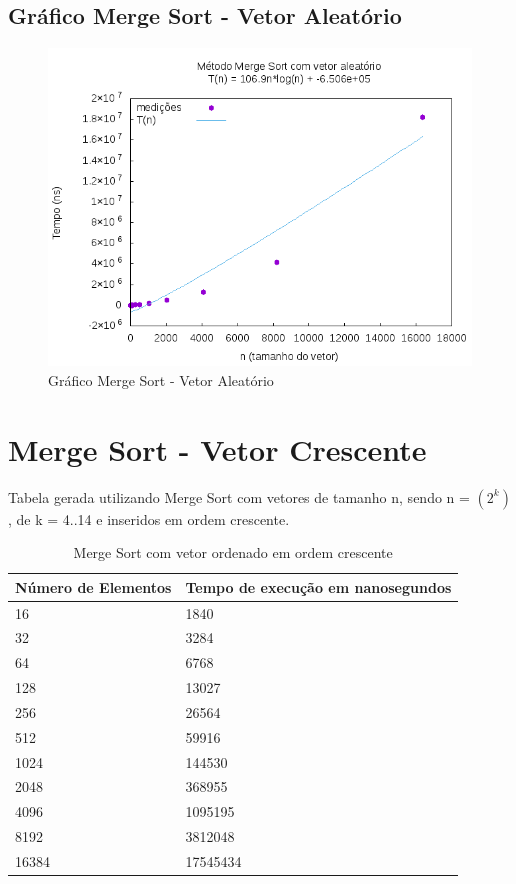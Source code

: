 \documentclass[12pt,a4paper,twoside]{report}
\begin{document}
\subsection{Gráfico Merge Sort - Vetor Aleatório}
\begin{figure}[H]
    \centering
    \includegraphics[width=0.7\linewidth]{graficos/MergeSort/vIntAleatorio/vIntAleatorio.png}
  \caption{Gráfico Merge Sort - Vetor Aleatório}
\end{figure}

\section{Merge Sort - Vetor Crescente}
Tabela gerada utilizando Merge Sort com vetores de tamanho n, sendo n = $(2^k)$, de k = 4..14 e inseridos em ordem crescente.
\begin{table}[H]
\centering
\caption{Merge Sort com vetor ordenado em ordem crescente}
\label{my-label}
\begin{tabular}{|l|l|}
\hline
\multicolumn{1}{|c|}{\textbf{Número de Elementos}} & \multicolumn{1}{c|}{\textbf{Tempo de execução em nanosegundos}} \\ \hline
16 & 1840 \\ \hline
32 & 3284 \\ \hline
64 & 6768 \\ \hline
128 & 13027 \\ \hline
256 & 26564 \\ \hline
512 & 59916 \\ \hline
1024 & 144530 \\ \hline
2048 & 368955 \\ \hline
4096 & 1095195 \\ \hline
8192 & 3812048 \\ \hline
16384 & 17545434 \\ \hline
\end{tabular}
\end{table}
\end{document}
